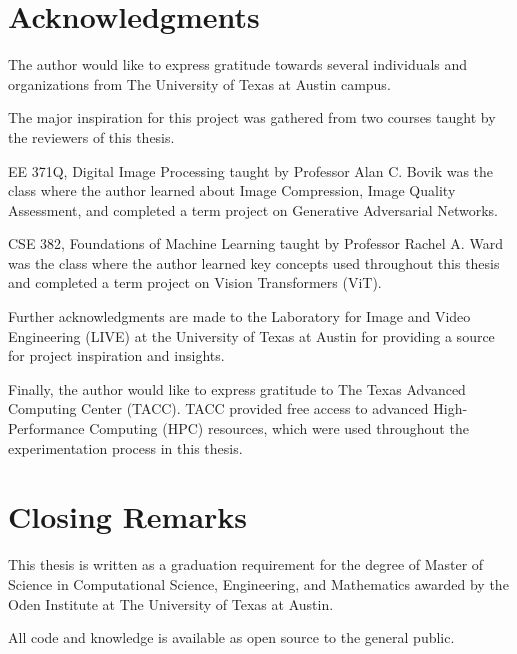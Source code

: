 \section{Acknowledgments}

The author would like to express gratitude towards several individuals and organizations
from The University of Texas at Austin campus.


The major inspiration for this project was gathered from two courses taught by the
reviewers of this thesis.


EE 371Q, Digital Image Processing taught by Professor Alan C. Bovik was the class
where the author learned about 
Image Compression, Image Quality Assessment, and completed a term
project on Generative Adversarial Networks.


CSE 382, Foundations of Machine Learning taught by Professor Rachel A. Ward 
was the class where the author learned key concepts used throughout this thesis
and completed a term project on Vision Transformers (ViT).


Further acknowledgments are made to the Laboratory for Image and Video Engineering (LIVE) at the 
University of Texas at Austin for providing a source for project inspiration and insights.


Finally, the author would like to express gratitude to The Texas Advanced Computing Center (TACC).
TACC provided free access to advanced High-Performance Computing (HPC) resources,
which were used throughout the experimentation process in this thesis.

\section{Closing Remarks}

This thesis is written as a graduation requirement for the degree of Master of Science 
in Computational Science, Engineering, and Mathematics awarded by the Oden Institute at 
The University of Texas at Austin.


All code and knowledge is available as open source to the general public.